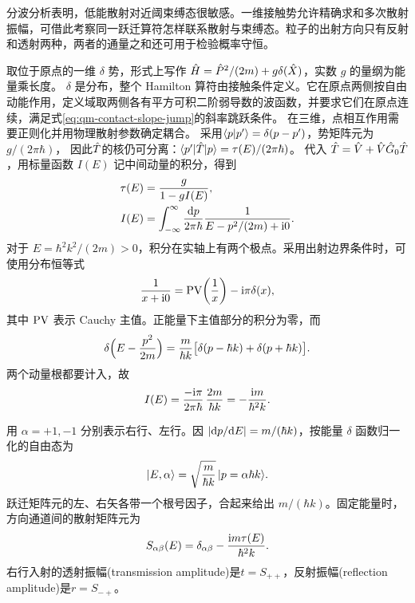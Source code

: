 \label{sec:qm-contact-potential}
分波分析表明，低能散射对近阈束缚态很敏感。一维接触势允许精确求和多次散射振幅，可借此考察同一跃迁算符怎样联系散射与束缚态。粒子的出射方向只有反射和透射两种，两者的通量之和还可用于检验概率守恒。

取位于原点的一维 $\delta$ 势，形式上写作 $\hat{H} = \hat{P}^2/(2m) + g\delta(\hat{X})$，实数 $g$ 的量纲为能量乘长度。
$\delta$ 是分布，整个 Hamilton 算符由接触条件定义。它在原点两侧按自由动能作用，定义域取两侧各有平方可积二阶弱导数的波函数，并要求它们在原点连续，满足式\eqref{eq:qm-contact-slope-jump}的斜率跳跃条件。
在三维，点相互作用需要正则化并用物理散射参数确定耦合。
采用$\langle p\vert p'\rangle = \delta(p - p')$，势矩阵元为$g/(2\pi\hbar)$，
因此$\hat{T}$的核仍可分离：$\langle p'\vert\hat{T}\vert p\rangle = \tau(E)/(2\pi\hbar)$。
代入 $\hat{T} = \hat{V} + \hat{V}\hat{G}_0\hat{T}$，用标量函数 $I(E)$ 记中间动量的积分，得到
\begin{subequations}
    \begin{align}
        \tau(E) &= \frac{g}{1 - g I(E)},\\
        I(E) &= \int_{-\infty}^\infty\frac{\mathop{}\!\mathrm{d} p}{2\pi\hbar}
        \frac1{E - p^2/(2m) + \mathrm{i}0}.
    \end{align}
\end{subequations}
对于 $E = \hbar^2 k^2/(2m) > 0$，积分在实轴上有两个极点。采用出射边界条件时，可使用分布恒等式
\begin{equation}
    \frac{1}{x + \mathrm{i}0} = \operatorname{PV}\!\left(\frac1x\right) - \mathrm{i}\pi\delta(x),
    \label{eq:outgoing-principal-value}
\end{equation}
其中 $\operatorname{PV}$ 表示 Cauchy 主值。正能量下主值部分的积分为零，而
\begin{equation}
    \delta\Bigl(E - \frac{p^2}{2m}\Bigr)
    = \frac{m}{\hbar k}
    \bigl[\delta(p - \hbar k) + \delta(p + \hbar k)\bigr].
\end{equation}
两个动量根都要计入，故
\[
    I(E) = \frac{-\mathrm{i}\pi}{2\pi\hbar}\,\frac{2m}{\hbar k}
        = -\frac{\mathrm{i} m}{\hbar^2k}.
\]

用 $\alpha = +1,-1$ 分别表示右行、左行。因 $\lvert\mathop{}\!\mathrm{d} p/\mathrm{d} E\rvert = m/(\hbar k)$，按能量 $\delta$ 函数归一化的自由态为
\[
    \lvert E,\alpha\rangle = \sqrt{\frac{m}{\hbar k}}\,\lvert p = \alpha\hbar k\rangle.
\]
跃迁矩阵元的左、右矢各带一个根号因子，合起来给出 $m/(\hbar k)$。固定能量时，方向通道间的散射矩阵元为
\begin{equation}
    S_{\alpha\beta}(E) = \delta_{\alpha\beta}
    - \frac{\mathrm{i} m\tau(E)}{\hbar^2k}.
\end{equation}
右行入射的透射振幅(transmission amplitude)是$t = S_{++}$，反射振幅(reflection amplitude)是$r = S_{-+}$。

